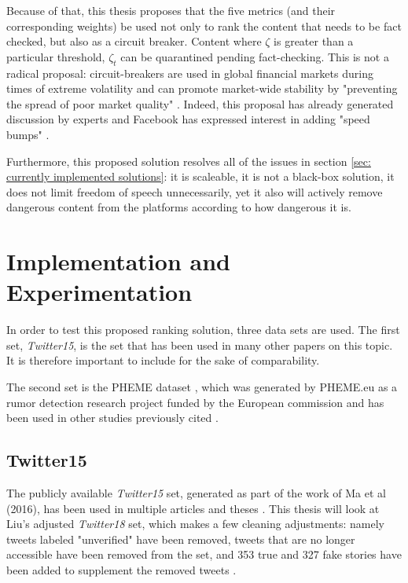 \documentclass[preprint,review,12pt]{elsarticle}
\begin{document}
Because of that, this thesis proposes that the five metrics (and their corresponding weights) be used not only to rank the content that needs to be fact checked, but also as a circuit breaker. Content where $\zeta$ is greater than a particular threshold, $\zeta_t$ can be quarantined pending fact-checking. This is not a radical proposal: circuit-breakers are used in global financial markets during times of extreme volatility \cite{wang2019microstructure,schwert1990stock} and can promote market-wide stability by "preventing the spread of poor market quality" \cite{brugler2014single,schneider2020stock}. Indeed, this proposal has already generated discussion by experts \cite{goodman2020digital,simpson2020fighting} and Facebook has expressed interest in adding "speed bumps" \cite{bond2020circuit}.

Furthermore, this proposed solution resolves all of the issues in section \ref{sec: currently implemented solutions}: it is scaleable, it is not a black-box solution, it does not limit freedom of speech unnecessarily, yet it also will actively remove dangerous content from the platforms according to how dangerous it is.

\section{Implementation and Experimentation}
In order to test this proposed ranking solution, three data sets are used. The first set, \textit{Twitter15}, is the set that has been used in many other papers on this topic. It is therefore important to include for the sake of comparability.

The second set is the PHEME dataset \cite{kochkina2018pheme}, which was generated by PHEME.eu as a rumor detection research project funded by the European commission and has been used in other studies previously cited \cite{zubiaga2016analysing}. 


\subsection{Twitter15}
 The publicly available \textit{Twitter15} set, generated as part of the work of Ma et al (2016), has been used in multiple articles and theses \citep{liu2018early,ma2017detect,ma2016detecting,khoo2020interpretable,liu2019early,huang2019deep}. This thesis will look at Liu's adjusted \textit{Twitter18} set, which makes a few cleaning adjustments: namely tweets labeled "unverified" have been removed, tweets that are no longer accessible have been removed from the set, and 353 true and 327 fake stories have been added to supplement the removed tweets \citep{liu2019early}. 
 
\end{document}
